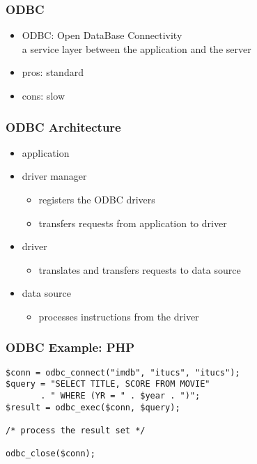 \documentclass[dvipsnames]{beamer}
\theoremstyle{plain}
\begin{document}
\begin{frame}[label=odbc]
  \frametitle{ODBC}

  \begin{itemize}
    \item \alert{ODBC}: Open DataBase Connectivity\\
      a service layer between the application and the server

    \bigskip
    \item pros: standard
    \item cons: slow
  \end{itemize}
\end{frame}

\begin{frame}
  \frametitle{ODBC Architecture}

  \begin{itemize}
    \item application

    \medskip
    \item driver manager
    \begin{itemize}
      \item registers the ODBC drivers
      \item transfers requests from application to driver
    \end{itemize}

    \medskip
    \item driver
    \begin{itemize}
      \item translates and transfers requests to data source
    \end{itemize}

    \medskip
    \item data source
    \begin{itemize}
      \item processes instructions from the driver
    \end{itemize}
  \end{itemize}
\end{frame}

\begin{frame}[fragile]
  \frametitle{ODBC Example: PHP}

  \begin{lstlisting}
$conn = odbc_connect("imdb", "itucs", "itucs");
$query = "SELECT TITLE, SCORE FROM MOVIE"
       . " WHERE (YR = " . $year . ")";
$result = odbc_exec($conn, $query);

/* process the result set */

odbc_close($conn);
  \end{lstlisting}
\end{frame}
\end{document}
